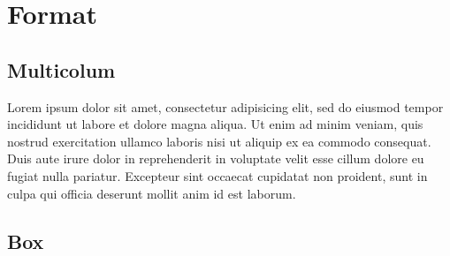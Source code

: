 \documentclass[twoside,11pt]{article}
\begin{document}
\begin{table}[H]
    \centering
    \caption{Table Demo}

    \label{tab:tabdemo}
\end{table}

\section{Format}

\subsection{Multicolum}

\begin{multicols}{2}

    Lorem ipsum dolor sit amet, consectetur adipisicing elit, sed do eiusmod tempor incididunt ut labore et dolore magna aliqua. Ut enim ad minim veniam, quis nostrud exercitation ullamco laboris nisi ut aliquip ex ea commodo consequat. Duis aute irure dolor in reprehenderit in voluptate velit esse cillum dolore eu fugiat nulla pariatur. Excepteur sint occaecat cupidatat non proident, sunt in culpa qui officia deserunt mollit anim id est laborum.

\end{multicols}

\subsection{Box}
\end{document}
